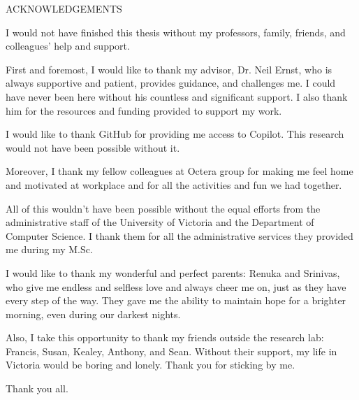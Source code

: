 \newpage
{}

\begin{center}
ACKNOWLEDGEMENTS
\end{center}

I would not have finished this thesis without my professors, family, friends, and colleagues' help and support.

First and foremost, I would like to thank my advisor, Dr. Neil Ernst, who is always supportive and patient, provides guidance, and challenges me. I could have never been here without his countless and significant support. I also thank him for the resources and funding provided to support my work.

I would like to thank GitHub for providing me access to Copilot. This research would not have been possible without it.

Moreover, I thank my fellow colleagues at Octera group for making me feel home and motivated at workplace and for all the activities and fun we had together.

All of this wouldn’t have been possible without the equal efforts from the administrative staff of the University of Victoria and the Department of Computer Science. I thank them for all the administrative services they provided me during my M.Sc.

I would like to thank my wonderful and perfect parents: Renuka and Srinivas, who give me endless and selfless love and always cheer me on, just as they have every step of the way. They gave me the ability to maintain hope for a brighter morning, even during our darkest nights.

Also, I take this opportunity to thank my friends outside the research lab: Francis, Susan, Kealey, Anthony, and Sean. Without their support, my life in Victoria would be boring and lonely. Thank you for sticking by me.

Thank you all.


